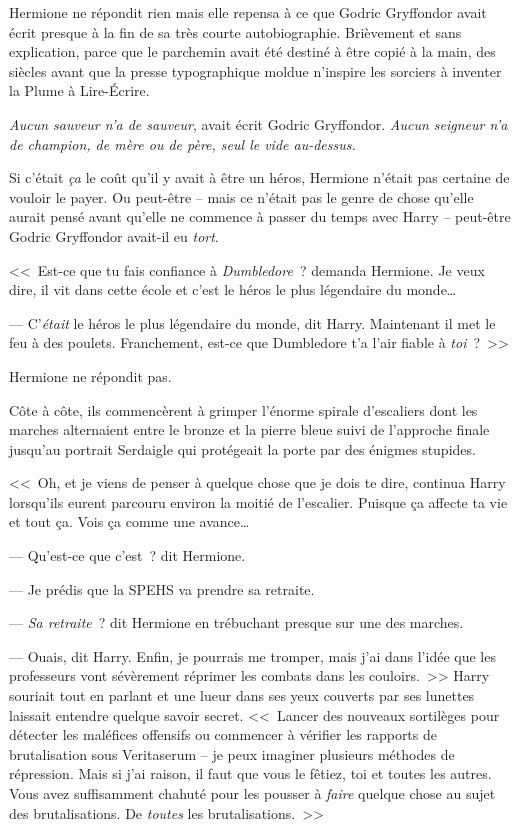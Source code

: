 Hermione ne répondit rien mais elle repensa à ce que Godric Gryffondor avait écrit presque à la fin de sa très courte autobiographie. Brièvement et sans explication, parce que le parchemin avait été destiné à être copié à la main, des siècles avant que la presse typographique moldue n'inspire les sorciers à inventer la Plume à Lire-Écrire.

\emph{Aucun sauveur n'a de sauveur}, avait écrit Godric Gryffondor. \emph{Aucun seigneur n'a de champion, de mère ou de père, seul le vide au-dessus.}

Si c'était \emph{ça} le coût qu'il y avait à être un héros, Hermione n'était pas certaine de vouloir le payer. Ou peut-être -- mais ce n'était pas le genre de chose qu'elle aurait pensé avant qu'elle ne commence à passer du temps avec Harry -- peut-être Godric Gryffondor avait-il eu \emph{tort}.

<<~Est-ce que tu fais confiance à \emph{Dumbledore}~? demanda Hermione. Je veux dire, il vit dans cette école et c'est le héros le plus légendaire du monde…

--- C'\emph{était} le héros le plus légendaire du monde, dit Harry. Maintenant il met le feu à des poulets. Franchement, est-ce que Dumbledore t'a l'air fiable à \emph{toi}~?~>>

Hermione ne répondit pas.

Côte à côte, ils commencèrent à grimper l'énorme spirale d'escaliers dont les marches alternaient entre le bronze et la pierre bleue suivi de l'approche finale jusqu'au portrait Serdaigle qui protégeait la porte par des énigmes stupides.

<<~Oh, et je viens de penser à quelque chose que je dois te dire, continua Harry lorsqu'ils eurent parcouru environ la moitié de l'escalier. Puisque ça affecte ta vie et tout ça. Vois ça comme une avance…

--- Qu'est-ce que c'est~? dit Hermione.

--- Je prédis que la SPEHS va prendre sa retraite.

--- \emph{Sa retraite}~? dit Hermione en trébuchant presque sur une des marches.

--- Ouais, dit Harry. Enfin, je pourrais me tromper, mais j'ai dans l'idée que les professeurs vont sévèrement réprimer les combats dans les couloirs.~>> Harry souriait tout en parlant et une lueur dans ses yeux couverts par ses lunettes laissait entendre quelque savoir secret. <<~Lancer des nouveaux sortilèges pour détecter les maléfices offensifs ou commencer à vérifier les rapports de brutalisation sous Veritaserum -- je peux imaginer plusieurs méthodes de répression. Mais si j'ai raison, il faut que vous le fêtiez, toi et toutes les autres. Vous avez suffisamment chahuté pour les pousser à \emph{faire} quelque chose au sujet des brutalisations. De \emph{toutes} les brutalisations.~>>

